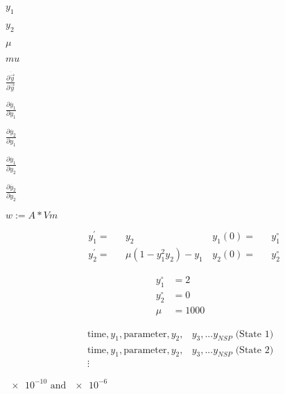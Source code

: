 \documentclass{article}
\begin{document}
$y_1$
\pagebreak

$y_2$
\pagebreak

$\mu$
\pagebreak

$mu$
\pagebreak

$\frac{\partial \dot{\vec{y}}}{\partial \vec{y}}$
\pagebreak

$\frac{\partial \dot{y_1}}{\partial y_1}$
\pagebreak

$\frac{\partial \dot{y_2}}{\partial y_1}$
\pagebreak

$\frac{\partial \dot{y_1}}{\partial y_2}$
\pagebreak

$\frac{\partial \dot{y_2}}{\partial y_2}$
\pagebreak

$w := A * Vm$
\pagebreak

\begin{align} & y_1^\prime =&& y_2 \, & y_1(0) =&& y_1^\circ \nonumber \\ & y_2^\prime =&& \mu \left(1 - y_1^2y_2\right) - y_1 \, & y_2(0) =&& y_2^\circ \nonumber \end{align}
\pagebreak

\begin{align} y_1^\circ &= 2 \nonumber \\ y_2^\circ &= 0 \nonumber \\ \mu&= 1000 \nonumber \end{align}
\pagebreak

\begin{align} \nonumber \text{time}, y_1, \text{parameter}, y_2,& y_3, ... y_{NSP} \text{ (State 1)}\\ \nonumber \text{time}, y_1, \text{parameter}, y_2,& y_3, ... y_{NSP} \text{ (State 2)}\\ \nonumber \vdots& \end{align}
\pagebreak

$\num{e-10}\text{ and }\num{e-6}$
\pagebreak
\end{document}
